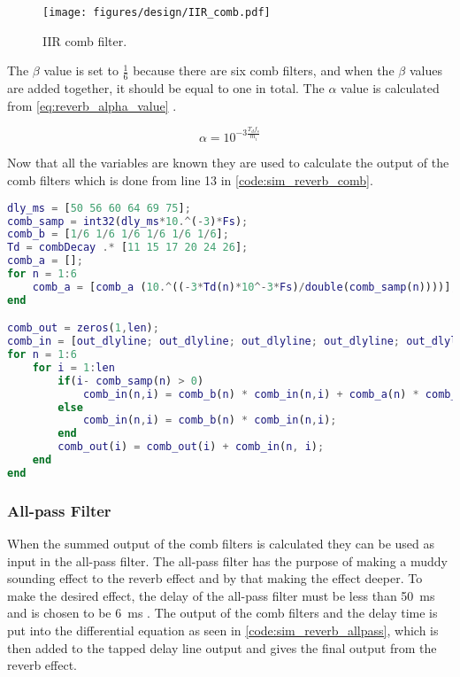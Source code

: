 \begin{figure}[htbp]
	\centering
	\texttt{[image: figures/design/IIR\_comb.pdf]}
	\caption{IIR comb filter.}
	\label{fig:comb_iir1}
\end{figure}

The $\beta$ value is set to $\frac{1}{6}$ because there are six comb filters, and when the $\beta$ values are added together, it should be equal to one in total. The $\alpha$ value is calculated from \autoref{eq:reverb_alpha_value} \citep{DAFX}.

\begin{equation}\label{eq:reverb_alpha_value}
 	\alpha = 10^{-3\frac{T_d f_s}{m_i}}
\end{equation} 

\startexplain
\stopexplain

Now that all the variables are known they are used to calculate the output of the comb filters which is done from line 13 in \autoref{code:sim_reverb_comb}. 

\begin{lstlisting}[caption={Simulation of the comb filters.},language=MATLAB,label={code:sim_reverb_comb},tabsize=2]
%comb filters
dly_ms = [50 56 60 64 69 75];
comb_samp = int32(dly_ms*10.^(-3)*Fs);
comb_b = [1/6 1/6 1/6 1/6 1/6 1/6];
Td = combDecay .* [11 15 17 20 24 26];
comb_a = [];
for n = 1:6
    comb_a = [comb_a (10.^((-3*Td(n)*10^-3*Fs)/double(comb_samp(n))))];
end

comb_out = zeros(1,len);
comb_in = [out_dlyline; out_dlyline; out_dlyline; out_dlyline; out_dlyline; out_dlyline];
for n = 1:6
    for i = 1:len
        if(i- comb_samp(n) > 0)
            comb_in(n,i) = comb_b(n) * comb_in(n,i) + comb_a(n) * comb_in(n,i - comb_samp(n));
        else
            comb_in(n,i) = comb_b(n) * comb_in(n,i);
        end
        comb_out(i) = comb_out(i) + comb_in(n, i);
    end
end
\end{lstlisting}

\subsubsection{All-pass Filter}
When the summed output of the comb filters is calculated they can be used as input in the all-pass filter. The all-pass filter has the purpose of making a muddy sounding effect to the reverb effect and by that making the effect deeper. To make the desired effect, the delay of the all-pass filter must be less than \SI{50}{\milli \second} and is chosen to be \SI{6}{\milli \second} \citep{DAFX}. The output of the comb filters and the delay time is put into the differential equation as seen in \autoref{code:sim_reverb_allpass}, which is then added to the tapped delay line output and gives the final output from the reverb effect. 


